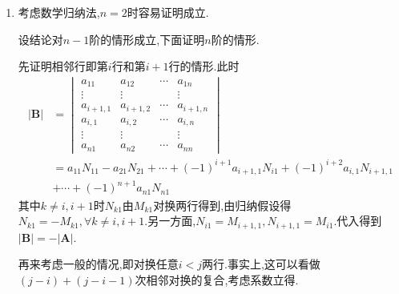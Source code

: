 \begin{formal}
\begin{Proof}
\begin{enumerate}[label = {\textup{(\arabic*)}}]
然后考虑列的情形,一方面,如果乘上常数$c$的是第一列,做展开显然成立.

另一方面,若乘上常数$c$的是第$j\geqslant 2$列,做展开即得\[
\left|\bm{B}\right|=a_{11}N_{11}-a_{21}N_{21}+\cdots+(-1)^{n+1}a_{n1}N_{n1}
\]注意到$N_{i1}$是$M_{i1}$的某一列乘上常数$c$得到,于是由归纳假设$N_{i1}=cM_{i1},\forall 1\leqslant i\leqslant n.$于是\begin{align*}
\left|\bm{B}\right|&=ca_{11}M_{11}-ca_{21}M_{21}+\cdots+c(-1)^{n+1}a_{n1}M_{n1}\\
&=c\left|\bm{A}\right|
\end{align*}\vfill

\item 考虑数学归纳法,$n=2$时容易证明成立.

设结论对$n-1$阶的情形成立,下面证明$n$阶的情形.

先证明相邻行即第$i$行和第$i+1$行的情形.此时
\begin{align*}
\left|\bm{B}\right|&=\begin{vmatrix}
    a_{11}&a_{12}&\cdots&a_{1n}\\
    \vdots&\vdots& &\vdots\\
    a_{i+1,1}&a_{i+1,2}&\cdots&a_{i+1,n}\\
    a_{i,1}&a_{i,2}&\cdots&a_{i,n}\\
    \vdots&\vdots& &\vdots\\
    a_{n1}&a_{n2}&\cdots&a_{nn}
\end{vmatrix}\\
&=a_{11}N_{11}-a_{21}N_{21}+\cdots+(-1)^{i+1}a_{i+1,1}N_{i1}+(-1)^{i+2}a_{i,1}N_{i+1,1}\\
&+\cdots+(-1)^{n+1}a_{n1}N_{n1}
\end{align*}
其中$k\neq i,i+1$时$N_{k1}$由$M_{k1}$对换两行得到,由归纳假设得$N_{k1}=-M_{k1},\forall k\neq i,i+1.$另一方面,$N_{i1}=M_{i+1,1},N_{i+1,1}=M_{i1}.$代入得到$\left|\bm{B}\right|=-\left|\bm{A}\right|.$

再来考虑一般的情况,即对换任意$i<j$两行.事实上,这可以看做$\left(j-i\right)+\left(j-i-1\right)$次相邻对换的复合,考虑系数立得.


\end{enumerate}
\end{Proof}
\end{formal}
